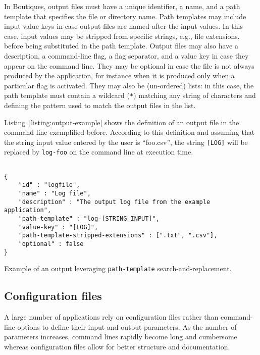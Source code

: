 \documentclass{article}
\newcommand{\boutiques}{Boutiques\xspace}
\begin{document}
In \boutiques, output files must have a unique identifier, a name, and
a path template that specifies the file or directory name. Path
templates may include input value keys in case output files are named
after the input values. In this case, input values may be stripped
from specific strings, e.g., file extensions, before being substituted
in the path template. Output files may also have a description, a
command-line flag, a flag separator, and a value key in case they
appear on the command line. They may be optional in case the file is
not always produced by the application, for instance when it is
produced only when a particular flag is activated. They may also be
(un-ordered) lists: in this case, the path template must contain a
wildcard (\texttt{*}) matching any string of characters and defining
the pattern used to match the output files in the list.

Listing~\ref{listing:output-example} shows the definition of an output
file in the command line exemplified before. According to this
definition and assuming that the string input value entered by the
user is ``foo.csv'', the string \texttt{[LOG]} will be
replaced by \texttt{log-foo} on the command line at execution time.

\begin{listing}
\begin{verbatim}

{
    "id" : "logfile",
    "name" : "Log file",
    "description" : "The output log file from the example application",
    "path-template" : "log-[STRING_INPUT]",
    "value-key" : "[LOG]",
    "path-template-stripped-extensions" : [".txt", ".csv"],
    "optional" : false
}
\end{verbatim}
\caption{Example of an output leveraging \texttt{path-template} search-and-replacement.} 
\label{listing:output-example}
\end{listing}

\subsection{Configuration files}
\label{sec:configuration-files}
A large number of applications rely on configuration files rather than
command-line options to define their input and output parameters. As
the number of parameters increases, command lines rapidly become long
and cumbersome whereas configuration files allow for better structure
and documentation.
\end{document}
